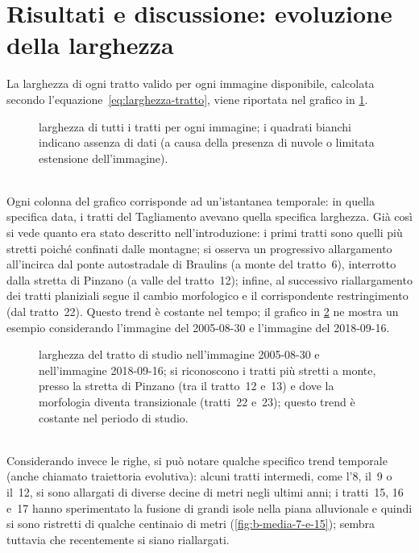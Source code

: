 \section{Risultati e discussione: evoluzione della larghezza}
\label{sec:larghezza}
La larghezza di ogni tratto valido per ogni immagine disponibile, calcolata secondo l'equazione~\eqref{eq:larghezza-tratto}, viene riportata nel grafico in \cref{graph:larghezze-tutti-tratti}.
%
\begin{figure}
	\centering
	
	\caption[larghezza di tutti i tratti per ogni immagine]{larghezza di tutti i tratti per ogni immagine; i quadrati bianchi indicano assenza di dati (a causa della presenza di nuvole o limitata estensione dell'immagine).}
	\label{graph:larghezze-tutti-tratti}
\end{figure}
%
\\
Ogni colonna del grafico corrisponde ad un'istantanea temporale: in quella specifica data, i tratti del Tagliamento avevano quella specifica larghezza.
Già così si vede quanto era stato descritto nell'introduzione:
i primi tratti sono quelli più stretti poiché confinati dalle montagne;
si osserva un progressivo allargamento all'incirca dal ponte autostradale di Braulins (a monte del tratto~6), interrotto dalla stretta di Pinzano (a valle del tratto~12);
infine, al successivo riallargamento dei tratti planiziali segue il cambio morfologico e il corrispondente restringimento (dal tratto~22).
Questo trend è costante nel tempo; il grafico in \cref{graph:larghezza-2005-2018-09} ne mostra un esempio considerando l'immagine \AST{} del 2005-08-30 e l'immagine \Se{} del 2018-09-16.
%
\begin{figure}
	\centering
	
	\caption[larghezza del tratto di studio nel 2005-08-30 e nel 2018-09-16]{larghezza del tratto di studio nell'immagine \AST{} 2005-08-30 e nell'immagine \Se{} 2018-09-16; si riconoscono i tratti più stretti a monte, presso la stretta di Pinzano (tra il tratto~12 e~13) e dove la morfologia diventa transizionale (tratti~22 e~23); questo trend è costante nel periodo di studio.}
	\label{graph:larghezza-2005-2018-09}
\end{figure}
%
\\
Considerando invece le righe, si può notare qualche specifico trend temporale (anche chiamato traiettoria evolutiva):
alcuni tratti intermedi, come l'8, il~9 o il~12, si sono allargati di diverse decine di metri negli ultimi anni;
i tratti~15, 16 e~17 hanno sperimentato la fusione di grandi isole nella piana alluvionale e quindi si sono ristretti di qualche centinaio di metri (\cref{fig:b-media-7-e-15}); sembra tuttavia che recentemente si siano riallargati.
